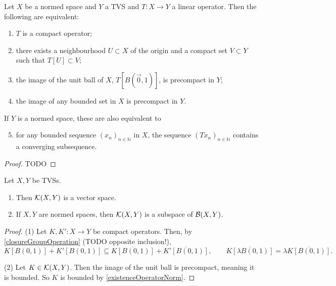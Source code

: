 \begin{proposition}
Let $X$ be a normed space and $Y$ a TVS and $T:X\to Y$ a linear operator. Then the following are equivalent:
\begin{enumerate}
\item $T$ is a compact operator;
\item there exists a neighbourhood $U \subset X$ of the origin and a compact set $V\subset Y$ such that $T[U] \subset V$;
\item the image of the unit ball of $X$, $T[B(\vec{0},1)]$, is precompact in $Y$;
\item the image of any bounded set in $X$ is precompact in $Y$.
\end{enumerate}
If $Y$ is a normed space, these are also equivalent to
\begin{enumerate} \setcounter{enumi}{4}
\item for any bounded sequence $(x_{n})_{n\in \mathbb{N}}$ in $X$, the sequence $(Tx_{n})_{n\in \mathbb{N} }$ contains a converging subsequence.
\end{enumerate}
\end{proposition}
\begin{proof}
TODO
\end{proof}


\begin{lemma}
Let $X,Y$ be TVSs.
\begin{enumerate}
\item Then $\operatorname{\mathcal{K}}(X, Y)$ is a vector space.
\item If $X,Y$ are normed spaces, then $\operatorname{\mathcal{K}}(X, Y)$ is a subspace of $\operatorname{\mathcal{B}}(X, Y)$.
\end{enumerate}
\end{lemma}
\begin{proof}
(1) Let $K,K':X\to Y$ be compact operators. Then, by \ref{closureGroupOperation} (TODO opposite inclusion!),
\[ \overline{K[B(0, 1)]+K'[B(0, 1)]} \subseteq \overline{K[B(0, 1)]}+\overline{K'[B(0, 1)]}, \qquad \overline{K[\lambda B(0, 1)]} = \lambda\overline{K[B(0, 1)]}. \]

(2) Let $K\in\operatorname{\mathcal{K}}(X, Y)$. Then the image of the unit ball is precompact, meaning it is bounded. So $K$ is bounded by \ref{existenceOperatorNorm}.
\end{proof}

